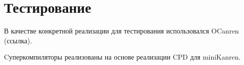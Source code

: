 \section{Тестирование}

В качестве конкретной реализации \ukanren для тестирования
использовался OCanren (ссылка).

Cуперкомпиляторы реализованы на основе реализации CPD для miniKanren.
